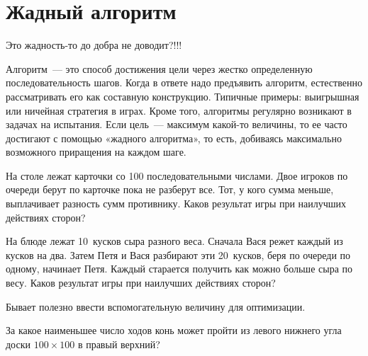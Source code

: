 
\section*{Жадный алгоритм}



\begin{flushright}
    Это жадность-то до добра не доводит?!!!
\end{flushright}

Алгоритм~— это способ достижения цели через жестко определенную
последовательность шагов.
Когда в ответе надо предъявить алгоритм, естественно рассматривать его как
составную конструкцию.
Типичные примеры: выигрышная или ничейная стратегия в играх.
Кроме того, алгоритмы регулярно возникают в задачах на испытания.
Если цель~— максимум какой-то величины, то ее часто достигают с помощью
«жадного алгоритма», то есть, добиваясь максимально возможного приращения
на каждом шаге.

\begin{problems}

\item
На столе лежат карточки со 100 последовательными числами.
Двое игроков по очереди берут по карточке пока не разберут все.
Тот, у кого сумма меньше, выплачивает разность сумм противнику.
Каков результат игры при наилучших действиях сторон?

\item
На блюде лежат 10~кусков сыра разного веса.
Сначала Вася режет каждый из кусков на два.
Затем Петя и Вася разбирают эти 20~кусков, беря по очереди по одному, начинает
Петя.
Каждый старается получить как можно больше сыра по весу.
Каков результат игры при наилучших действиях сторон?

\end{problems}

Бывает полезно ввести вспомогательную величину для оптимизации.

\begin{problems}

\item
За какое наименьшее число ходов конь может пройти из левого нижнего угла доски
$100 \times 100$ в правый верхний?

\end{problems}


